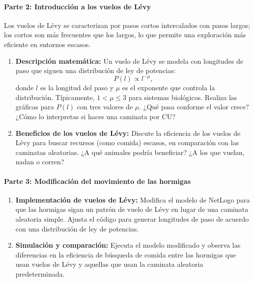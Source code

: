 \begin{ejercicio}[Tipo 2]
\paragraph{Parte 2: Introducción a los vuelos de Lévy}
Los vuelos de Lévy se caracterizan por pasos cortos intercalados con pasos
largos; los cortos son más frecuentes que los largos, lo que permite una
exploración más eficiente en entornos escasos.
\begin{enumerate}
  \item \textbf{Descripción matemática:} Un vuelo de Lévy se modela con
    longitudes de paso que siguen una distribución de ley de potencias:
    \[
      P(l) \propto l^{-\mu},
    \]
    donde $l$ es la longitud del paso y $\mu$ es el exponente que controla la
    distribución. Típicamente, $1<\mu\le 3$ para sistemas biológicos. Realiza
    las gráficas para $P(l)$ con tres valores de $\mu$. ¿Qué pasa conforme el
    valor crece? ¿Cómo lo interpretas si haces una caminata por CU? \\


  \item \textbf{Beneficios de los vuelos de Lévy:} Discute la eficiencia de los
    vuelos de Lévy para buscar recursos (como comida) escasos, en comparación
    con las caminatas aleatorias. ¿A qué animales podría beneficiar? ¿A los que
    vuelan, nadan o corren?
\end{enumerate}

\paragraph{Parte 3: Modificación del movimiento de las hormigas}
\begin{enumerate}
  \item \textbf{Implementación de vuelos de Lévy:} Modifica el modelo de
    NetLogo para que las hormigas sigan un patrón de vuelo de Lévy en lugar de
    una caminata aleatoria simple. Ajusta el código para generar longitudes de
    paso de acuerdo con una distribución de ley de potencias.
  \item \textbf{Simulación y comparación:} Ejecuta el modelo modificado y
    observa las diferencias en la eficiencia de búsqueda de comida entre las
    hormigas que usan vuelos de Lévy y aquellas que usan la caminata aleatoria
    predeterminada.
\end{enumerate}


\end{ejercicio}
